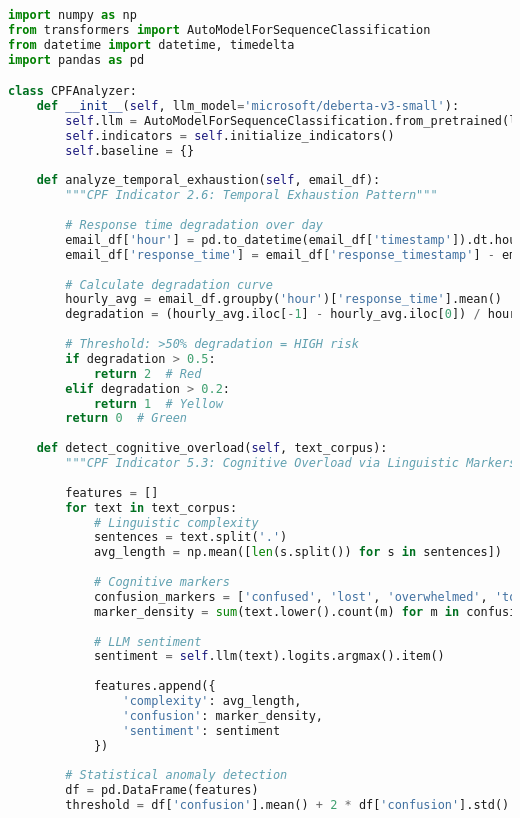 \documentclass[11pt,a4paper]{article}
\begin{document}
\begin{lstlisting}[language=Python, caption=Core CPF Processing Pipeline]
import numpy as np
from transformers import AutoModelForSequenceClassification
from datetime import datetime, timedelta
import pandas as pd

class CPFAnalyzer:
    def __init__(self, llm_model='microsoft/deberta-v3-small'):
        self.llm = AutoModelForSequenceClassification.from_pretrained(llm_model)
        self.indicators = self.initialize_indicators()
        self.baseline = {}
        
    def analyze_temporal_exhaustion(self, email_df):
        """CPF Indicator 2.6: Temporal Exhaustion Pattern"""
        
        # Response time degradation over day
        email_df['hour'] = pd.to_datetime(email_df['timestamp']).dt.hour
        email_df['response_time'] = email_df['response_timestamp'] - email_df['received_timestamp']
        
        # Calculate degradation curve
        hourly_avg = email_df.groupby('hour')['response_time'].mean()
        degradation = (hourly_avg.iloc[-1] - hourly_avg.iloc[0]) / hourly_avg.iloc[0]
        
        # Threshold: >50% degradation = HIGH risk
        if degradation > 0.5:
            return 2  # Red
        elif degradation > 0.2:
            return 1  # Yellow
        return 0  # Green
        
    def detect_cognitive_overload(self, text_corpus):
        """CPF Indicator 5.3: Cognitive Overload via Linguistic Markers"""
        
        features = []
        for text in text_corpus:
            # Linguistic complexity
            sentences = text.split('.')
            avg_length = np.mean([len(s.split()) for s in sentences])
            
            # Cognitive markers
            confusion_markers = ['confused', 'lost', 'overwhelmed', 'too much']
            marker_density = sum(text.lower().count(m) for m in confusion_markers) / len(text.split())
            
            # LLM sentiment
            sentiment = self.llm(text).logits.argmax().item()
            
            features.append({
                'complexity': avg_length,
                'confusion': marker_density,
                'sentiment': sentiment
            })
            
        # Statistical anomaly detection
        df = pd.DataFrame(features)
        threshold = df['confusion'].mean() + 2 * df['confusion'].std()
        

\end{lstlisting}
\end{document}

